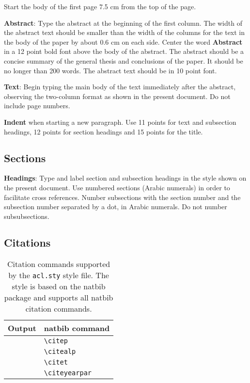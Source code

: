 \documentclass[11pt]{article}
\begin{document}
Start the body of the first page 7.5 cm from the top of the page.

{\bf Abstract}: Type the abstract at the beginning of the first
column. The width of the abstract text should be smaller than the
width of the columns for the text in the body of the paper by about
0.6 cm on each side. Center the word {\bf Abstract} in a 12 point bold font above the body of the abstract. The abstract should be a concise summary of the general thesis and conclusions of the paper. It should be no longer than 200 words. The abstract text should be in 10 point font.

{\bf Text}: Begin typing the main body of the text immediately after
the abstract, observing the two-column format as shown in 
the present document. Do not include page numbers.

{\bf Indent} when starting a new paragraph. Use 11 points for text and 
subsection headings, 12 points for section headings and 15 points for
the title. 

\subsection{Sections}

{\bf Headings}: Type and label section and subsection headings in the
style shown on the present document.  Use numbered sections (Arabic
numerals) in order to facilitate cross references. Number subsections
with the section number and the subsection number separated by a dot,
in Arabic numerals. Do not number subsubsections.

\subsection{Citations}

\begin{table}[h]
\centering
\begin{tabular}{|l|l|}
\hline
\textbf{Output} & \textbf{natbib command} \\
\hline
\citep{Gusfield:97} & \verb|\citep|\\
\citealp{Gusfield:97} & \verb|\citealp| \\
\citet{Gusfield:97} & \verb|\citet| \\
\citeyearpar{Gusfield:97} & \verb|\citeyearpar| \\
\hline
\end{tabular}
\caption{\label{citation-guide}
Citation commands supported by the {\tt acl.sty} style file.
The style is based on the natbib package and supports all natbib citation commands.}
\end{table}
\end{document}
